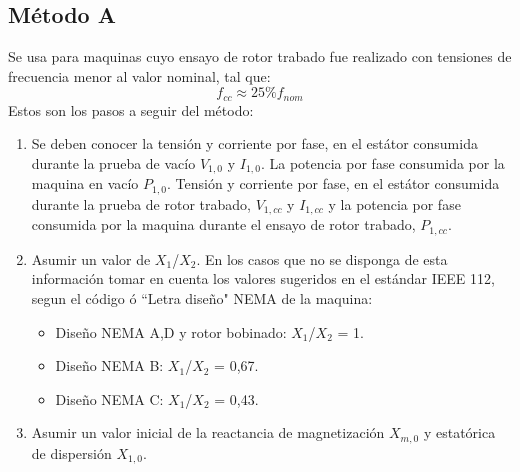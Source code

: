 \documentclass[11pt,letterpaper]{article}     %
\begin{document}
\subsection{Método A}
Se usa para maquinas cuyo ensayo de rotor trabado fue realizado con tensiones de frecuencia menor al valor nominal, tal que: 
\begin{equation}
	f_{cc}\approx 25\%f_{nom}
\end{equation}
Estos son los pasos a seguir del método:
\begin{enumerate}
	\item Se deben conocer la tensión y corriente por fase, en el estátor consumida durante la prueba de vacío $V_{1,0}$ y $I_{1,0}$. La potencia por fase consumida por la maquina en vacío $P_{1,0}$. Tensión y corriente por fase, en el estátor consumida durante la prueba de rotor trabado, $V_{1,cc}$ y $I_{1,cc}$ y la potencia por fase consumida por la maquina durante el ensayo de rotor trabado, $P_{1,cc}$.
	\item Asumir un valor de $X_{1}$/$X_{2}$. En los casos que no se disponga de esta información tomar en cuenta los valores sugeridos en el estándar IEEE 112, segun el código ó ``Letra diseño" NEMA de la maquina:
	\begin{itemize}
		\item Diseño NEMA A,D y rotor bobinado: $X_{1}$/$X_{2}$ = 1.
		\item Diseño NEMA B: $X_{1}$/$X_{2}$ = 0,67.
		\item Diseño NEMA C: $X_{1}$/$X_{2}$ = 0,43.
	\end{itemize}
	\item Asumir un valor inicial de la reactancia de magnetización $X_{m,0}$ y estatórica de dispersión $X_{1,0}$. 
	

\end{enumerate}
\end{document}
